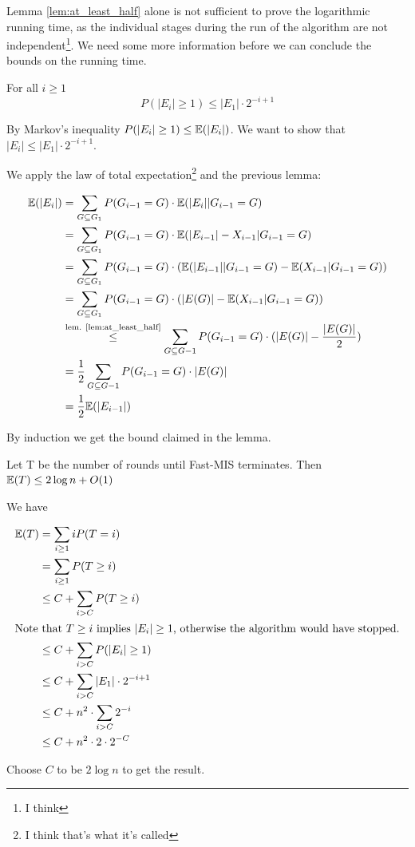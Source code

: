 Lemma \ref{lem:at_least_half} alone is not sufficient to prove the logarithmic running time, as the individual stages during the run of the algorithm are not independent\footnote{I think}. We need some more information before we can conclude the bounds on the running time.

\begin{lem} For all $i\geq 1$
\[P(|E_i| \geq 1) \leq |E_1| \cdot 2^{-i+1}\]
\end{lem}

\begin{pr} By Markov's inequality $P(|E_i| \geq 1) \leq \mathbb{E}(|E_i|)$. We want to show that $|E_i|\leq |E_1|\cdot 2^{-i+1}$.

We apply the law of total expectation\footnote{I think that's what it's called} and the previous lemma:

\begin{align*}
\mathbb{E}(|E_i|) &= \sum_{G\subseteq G_1} P(G_{i-1} =G) \cdot \mathbb{E}(|E_i| | G_{i-1}=G)\\
	&=\sum_{G\subseteq G_1}  P(G_{i-1} =G) \cdot \mathbb{E}(|E_{i-1}| -X_{i-1} | G_{i-1}=G)\\
	&=\sum_{G\subseteq G_1}  P(G_{i-1} =G) \cdot (\mathbb{E}(|E_{i-1}| | G_{i-1}=G) - \mathbb{E}( X_{i-1} | G_{i-1}=G))\\
	&=\sum_{G\subseteq G_1}  P(G_{i-1} =G) \cdot (|E(G)| - \mathbb{E}(X_{i-1} | G_{i-1}=G))\\
	&\stackrel{\text{lem. \ref{lem:at_least_half}}}{\leq} \sum_{G\subseteq G-1}  P(G_{i-1} =G) \cdot (|E(G)| - \frac{|E(G)|}{2})\\
	&=\frac 12 \sum_{G\subseteq G-1}  P(G_{i-1} =G) \cdot |E(G)|\\
	&=\frac 12 \mathbb{E}(|E_{i-1}|)\\
\end{align*}

By induction we get the bound claimed in the lemma.
\end{pr}

\begin{lem} Let T be the number of rounds until Fast-MIS terminates. Then $\mathbb{E}(T) \leq 2\log n+O(1)$\end{lem}

\begin{pr} We have

\begin{align*}
\mathbb{E}(T) &= \sum_{i\geq 1} i P(T=i) \\
	&= \sum_{i\geq 1} P(T\geq i)\\
	&\leq C + \sum_{i> C} P(T\geq i)\\
\intertext{Note that $T\geq i$ implies $|E_i|\geq 1$, otherwise the algorithm would have stopped.}
	&\leq C+ \sum_{i> C} P(|E_i|\geq 1)\\
	&\leq C+ \sum_{i>C} |E_1|\cdot 2^{-i+1}\\
	&\leq C+ n^2 \cdot \sum_{i>C} 2^{-i}\\
	&\leq C+ n^2 \cdot 2\cdot 2^{-C}\\
\end{align*}

Choose $C$ to be $2\log n$ to get the result.
\end{pr}

